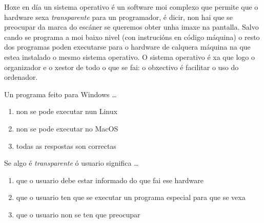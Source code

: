 Hoxe en día un sistema operativo é un software moi complexo que permite que o hardware sexa \textit{transparente} para un programador, é dicir, non hai que se preocupar da marca do escáner  se queremos obter unha imaxe na pantalla. Salvo cando se programa a moi baixo nivel (con instrucións en código máquina) o resto dos programas poden executarse para o hardware de calquera máquina na que estea instalado o mesmo  sistema operativo. O sistema operativo é xa que logo o organizador e o xestor de todo o que se fai: o obxectivo é facilitar o  uso do ordenador. 

\begin{diapo} \begin{frame}{ Un programa feito para Windows    \dots} 
\begin{enumerate}
	\item non se pode executar nun Linux\pause
	\item non se pode executar no MacOS \pause
	\item todas as respostas son correctas 
\end{enumerate} \end{frame}  \end{diapo}  
\begin{diapo}\begin{frame}{ Se algo é \textit{transparente} ó usuario significa  \dots}
\begin{enumerate}
	\item  que o usuario debe estar informado do que fai ese hardware\pause
	\item que o usuario ten que se executar un programa  especial para que se vexa \pause
	\item que o usuario non se ten que preocupar 
\end{enumerate} \end{frame} \end{diapo}
